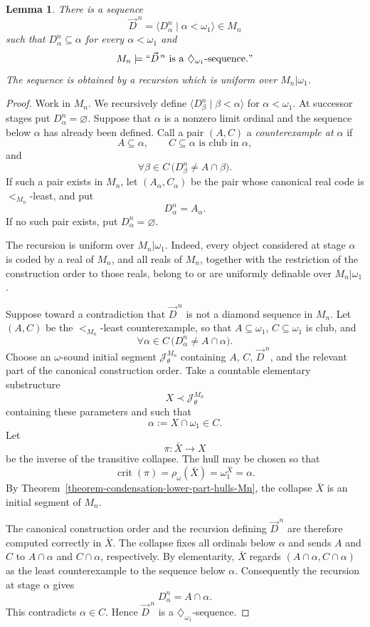 \documentclass[a4paper,11pt]{article}
\newtheorem{lemma}[theorem]{Lemma}
\begin{document}
\begin{lemma}
\label{lemma-canonical-Mn-diamond-sequence}
There is a sequence
\[
   \vec D^{\,n}
   =\langle D^n_\alpha\mid\alpha<\omega_1\rangle\in M_n
\]
such that $D^n_\alpha\subseteq\alpha$ for every $\alpha<\omega_1$ and
\[
   M_n\models
   ``\vec D^{\,n}\text{ is a }\diamondsuit_{\omega_1}\text{-sequence}."
\]
The sequence is obtained by a recursion which is uniform over
$M_n|\omega_1$.
\end{lemma}

\begin{proof}
Work in $M_n$.  We recursively define
$\langle D^n_\beta\mid\beta<\alpha\rangle$ for
$\alpha<\omega_1$.  At successor stages put $D^n_\alpha=\varnothing$.
Suppose that $\alpha$ is a nonzero limit ordinal and the sequence below
$\alpha$ has already been defined.  Call a pair $(A,C)$ a
\emph{counterexample at $\alpha$} if
\[
   A\subseteq\alpha,
   \qquad C\subseteq\alpha\text{ is club in }\alpha,
\]
and
\[
   \forall\beta\in C\,
      \bigl(D^n_\beta\neq A\cap\beta\bigr).
\]
If such a pair exists in $M_n$, let $(A_\alpha,C_\alpha)$ be the pair whose
canonical real code is $<_{M_n}$-least, and put
\[
   D^n_\alpha=A_\alpha.
\]
If no such pair exists, put $D^n_\alpha=\varnothing$.

The recursion is uniform over $M_n|\omega_1$.  Indeed, every
object considered at stage $\alpha$ is coded by a real of $M_n$, and all
reals of $M_n$, together with the restriction of the construction order to
those reals, belong to or are uniformly definable over
$M_n|\omega_1$.

Suppose toward a contradiction that $\vec D^{\,n}$ is not a diamond sequence
in $M_n$.  Let $(A,C)$ be the $<_{M_n}$-least counterexample, so that
$A\subseteq\omega_1$, $C\subseteq\omega_1$ is club, and
\[
   \forall\alpha\in C\,
      \bigl(D^n_\alpha\neq A\cap\alpha\bigr).
\]
Choose an $\omega$-sound initial segment
$\mathcal J^{M_n}_\theta$ containing
$A$, $C$, $\vec D^{\,n}$, and the relevant part of the canonical construction
order.  Take a countable elementary substructure
\[
   X\prec\mathcal J^{M_n}_\theta
\]
containing these parameters and such that
\[
   \alpha:=X\cap\omega_1\in C.
\]
Let
\[
   \pi:\bar X\longrightarrow X
\]
be the inverse of the transitive collapse.  The hull may be chosen so that
\[
   \operatorname{crit}(\pi)
   =\rho_\omega(\bar X)
   =\omega_1^{\bar X}=\alpha.
\]
By Theorem~\ref{theorem-condensation-lower-part-hulls-Mn}, the collapse
$\bar X$ is an initial segment of $M_n$.

The canonical construction order and the recursion defining
$\vec D^{\,n}$ are therefore computed correctly in $\bar X$.  The collapse
fixes all ordinals below $\alpha$ and sends $A$ and $C$ to
$A\cap\alpha$ and $C\cap\alpha$, respectively.  By elementarity,
$\bar X$ regards $(A\cap\alpha,C\cap\alpha)$ as the least counterexample to
the sequence below $\alpha$.  Consequently the recursion at stage $\alpha$
gives
\[
   D^n_\alpha=A\cap\alpha.
\]
This contradicts $\alpha\in C$.  Hence $\vec D^{\,n}$ is a
$\diamondsuit_{\omega_1}$-sequence.
\end{proof}
\end{document}
